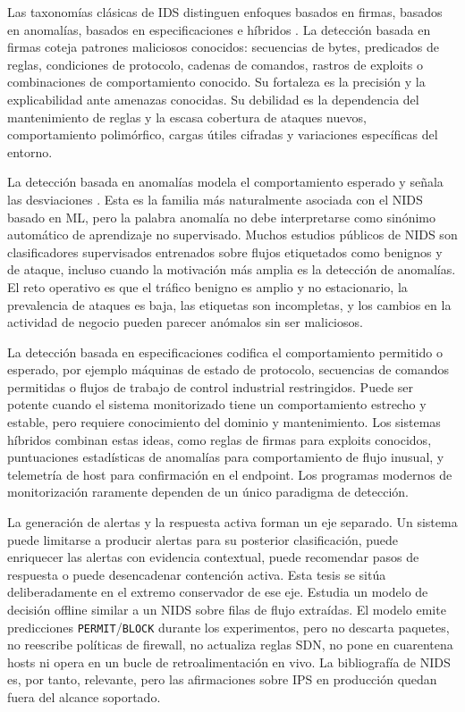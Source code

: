 Las taxonomías clásicas de IDS distinguen enfoques basados en firmas, basados en anomalías, basados en especificaciones e híbridos \parencite{ScarfoneMell2007}. La detección basada en firmas coteja patrones maliciosos conocidos: secuencias de bytes, predicados de reglas, condiciones de protocolo, cadenas de comandos, rastros de exploits o combinaciones de comportamiento conocido. Su fortaleza es la precisión y la explicabilidad ante amenazas conocidas. Su debilidad es la dependencia del mantenimiento de reglas y la escasa cobertura de ataques nuevos, comportamiento polimórfico, cargas útiles cifradas y variaciones específicas del entorno.

La detección basada en anomalías modela el comportamiento esperado y señala las desviaciones \parencite{SommerPaxson2010ClosedWorld,Ring2019DatasetSurvey}. Esta es la familia más naturalmente asociada con el NIDS basado en ML, pero la palabra anomalía no debe interpretarse como sinónimo automático de aprendizaje no supervisado. Muchos estudios públicos de NIDS son clasificadores supervisados entrenados sobre flujos etiquetados como benignos y de ataque, incluso cuando la motivación más amplia es la detección de anomalías. El reto operativo es que el tráfico benigno es amplio y no estacionario, la prevalencia de ataques es baja, las etiquetas son incompletas, y los cambios en la actividad de negocio pueden parecer anómalos sin ser maliciosos.

La detección basada en especificaciones codifica el comportamiento permitido o esperado, por ejemplo máquinas de estado de protocolo, secuencias de comandos permitidas o flujos de trabajo de control industrial restringidos. Puede ser potente cuando el sistema monitorizado tiene un comportamiento estrecho y estable, pero requiere conocimiento del dominio y mantenimiento. Los sistemas híbridos combinan estas ideas, como reglas de firmas para exploits conocidos, puntuaciones estadísticas de anomalías para comportamiento de flujo inusual, y telemetría de host para confirmación en el endpoint. Los programas modernos de monitorización raramente dependen de un único paradigma de detección.

La generación de alertas y la respuesta activa forman un eje separado. Un sistema puede limitarse a producir alertas para su posterior clasificación, puede enriquecer las alertas con evidencia contextual, puede recomendar pasos de respuesta o puede desencadenar contención activa. Esta tesis se sitúa deliberadamente en el extremo conservador de ese eje. Estudia un modelo de decisión offline similar a un NIDS sobre filas de flujo extraídas. El modelo emite predicciones \texttt{PERMIT}/\texttt{BLOCK} durante los experimentos, pero no descarta paquetes, no reescribe políticas de firewall, no actualiza reglas SDN, no pone en cuarentena hosts ni opera en un bucle de retroalimentación en vivo. La bibliografía de NIDS es, por tanto, relevante, pero las afirmaciones sobre IPS en producción quedan fuera del alcance soportado.

